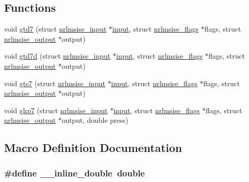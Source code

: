 \subsection*{Functions}
\begin{DoxyCompactItemize}
\item 
void \hyperlink{nrlmsise-00_8h_a0734128a68d5d8a372352d7436445d3e}{gtd7} (struct \hyperlink{structnrlmsise__input}{nrlmsise\+\_\+input} $\ast$\hyperlink{calc__flex_8c_a171692544b8e065853e387755849a433}{input}, struct \hyperlink{structnrlmsise__flags}{nrlmsise\+\_\+flags} $\ast$flags, struct \hyperlink{structnrlmsise__output}{nrlmsise\+\_\+output} $\ast$output)
\item 
void \hyperlink{nrlmsise-00_8h_a641d02c0e964627af5da468d4e07b87a}{gtd7d} (struct \hyperlink{structnrlmsise__input}{nrlmsise\+\_\+input} $\ast$\hyperlink{calc__flex_8c_a171692544b8e065853e387755849a433}{input}, struct \hyperlink{structnrlmsise__flags}{nrlmsise\+\_\+flags} $\ast$flags, struct \hyperlink{structnrlmsise__output}{nrlmsise\+\_\+output} $\ast$output)
\item 
void \hyperlink{nrlmsise-00_8h_a3e6980995783492f90a76daf5da46e4b}{gts7} (struct \hyperlink{structnrlmsise__input}{nrlmsise\+\_\+input} $\ast$\hyperlink{calc__flex_8c_a171692544b8e065853e387755849a433}{input}, struct \hyperlink{structnrlmsise__flags}{nrlmsise\+\_\+flags} $\ast$flags, struct \hyperlink{structnrlmsise__output}{nrlmsise\+\_\+output} $\ast$output)
\item 
void \hyperlink{nrlmsise-00_8h_a315893daf042707ca0e6e763ac9eabaf}{ghp7} (struct \hyperlink{structnrlmsise__input}{nrlmsise\+\_\+input} $\ast$\hyperlink{calc__flex_8c_a171692544b8e065853e387755849a433}{input}, struct \hyperlink{structnrlmsise__flags}{nrlmsise\+\_\+flags} $\ast$flags, struct \hyperlink{structnrlmsise__output}{nrlmsise\+\_\+output} $\ast$output, double press)
\end{DoxyCompactItemize}


\subsection{Macro Definition Documentation}
\hypertarget{nrlmsise-00_8h_ad38d2e3fa313d97ec413ff90989d9fdd}{
\subsubsection[{\+\_\+\+\_\+inline\+\_\+double}]{\setlength{\rightskip}{0pt plus 5cm}\#define \+\_\+\+\_\+inline\+\_\+double~double}}\label{nrlmsise-00_8h_ad38d2e3fa313d97ec413ff90989d9fdd}


